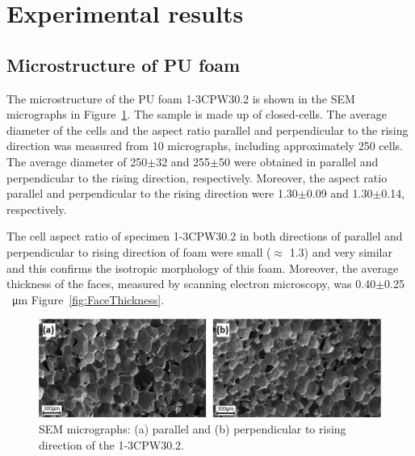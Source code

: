 \documentclass[review]{elsarticle}
\begin{document}
\section{Experimental results}

\subsection{Microstructure of PU foam}

The microstructure of the PU foam 1-3CPW30.2 is shown in the SEM micrographs in Figure~\ref{fig:SEMmicrostructure}. The sample is made up of closed-cells. The average diameter of the cells and the aspect ratio parallel and perpendicular to the rising direction was measured from 10 micrographs, including approximately 250 cells. The average diameter of  250$\pm$32 and 255$\pm$50 were obtained in parallel and perpendicular to the rising direction, respectively. Moreover, the aspect ratio parallel and perpendicular to the rising direction were 1.30$\pm$0.09 and 1.30$\pm$0.14, respectively.    
 
The cell aspect ratio of specimen 1-3CPW30.2 in both directions of parallel and perpendicular to rising direction of foam were small ($\approx$ 1.3) and very similar and this confirms the isotropic morphology of this foam. Moreover, the average thickness of the faces, measured by scanning electron microscopy, was 0.40$\pm$0.25 \SI{}{\micro\metre} Figure~\ref{fig:FaceThickness}.

\begin{figure}[hb]
  \centering
  \includegraphics[scale=0.3]{SEMmicrostructure}
  \captionsetup{justification=centering}
  \caption[Close up of \textit{Hemidactylus} sp. ]
   {SEM micrographs: (a) parallel and (b) perpendicular to rising direction of the 1-3CPW30.2.}
   \label{fig:SEMmicrostructure}
\end{figure}
\end{document}
